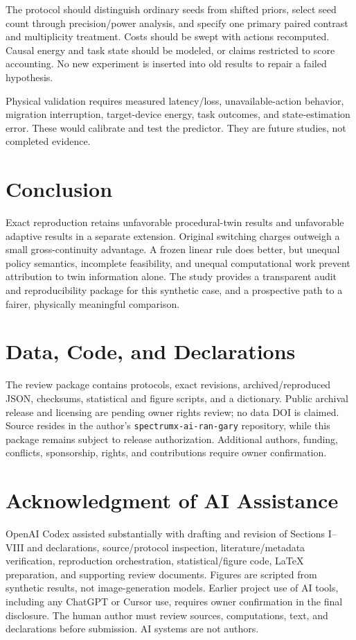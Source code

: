 \documentclass[letterpaper,journal]{IEEEtran}
\newcommand{\pol}[1]{\texttt{#1}}
\begin{document}
The protocol should distinguish ordinary seeds from shifted priors, select seed count through precision/power analysis, and specify one primary paired contrast and multiplicity treatment. Costs should be swept with actions recomputed. Causal energy and task state should be modeled, or claims restricted to score accounting. No new experiment is inserted into old results to repair a failed hypothesis.

Physical validation requires measured latency/loss, unavailable-action behavior, migration interruption, target-device energy, task outcomes, and state-estimation error. These would calibrate and test the predictor. They are future studies, not completed evidence.

\section{Conclusion}
Exact reproduction retains unfavorable procedural-twin results and unfavorable adaptive results in a separate extension. Original switching charges outweigh a small gross-continuity advantage. A frozen linear rule does better, but unequal policy semantics, incomplete feasibility, and unequal computational work prevent attribution to twin information alone. The study provides a transparent audit and reproducibility package for this synthetic case, and a prospective path to a fairer, physically meaningful comparison.

\section*{Data, Code, and Declarations}
The review package contains protocols, exact revisions, archived/reproduced JSON, checksums, statistical and figure scripts, and a dictionary. Public archival release and licensing are pending owner rights review; no data DOI is claimed. Source resides in the author's \pol{spectrumx-ai-ran-gary} repository, while this package remains subject to release authorization. Additional authors, funding, conflicts, sponsorship, rights, and contributions require owner confirmation.

\section*{Acknowledgment of AI Assistance}
OpenAI Codex assisted substantially with drafting and revision of Sections I--VIII and declarations, source/protocol inspection, literature/metadata verification, reproduction orchestration, statistical/figure code, LaTeX preparation, and supporting review documents. Figures are scripted from synthetic results, not image-generation models. Earlier project use of AI tools, including any ChatGPT or Cursor use, requires owner confirmation in the final disclosure. The human author must review sources, computations, text, and declarations before submission. AI systems are not authors.



\end{document}
